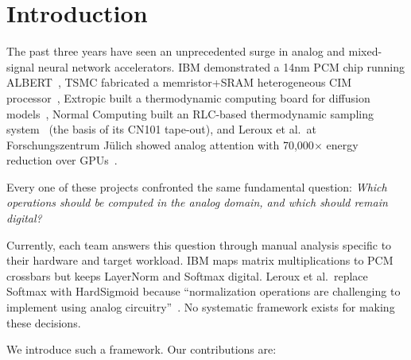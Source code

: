 \documentclass[11pt]{article}
\begin{document}
\begin{abstract}
non-idealities leave closure below $10^{-3}$ at a realistic 60~dB integrator gain; and thermal/shot noise is a third per-channel exposure obeying $\sigma_{\mathrm{pc}} = 0.78\sqrt{k_j\,2qB/I_0}$, equal to the mismatch residual at $I_0=1\,\mu$A and $B=122$~MHz, which is---to 2\%---the noise bandwidth the loop has when it is critically damped.
\end{abstract}

\section{Introduction}

The past three years have seen an unprecedented surge in analog and mixed-signal neural network accelerators. IBM demonstrated a 14nm PCM chip running ALBERT~\cite{ibm2025}, TSMC fabricated a memristor+SRAM heterogeneous CIM processor~\cite{tsmc2025}, Extropic built a thermodynamic computing board for diffusion models~\cite{extropic2025}, Normal Computing built an RLC-based thermodynamic sampling system~\cite{normal2025} (the basis of its CN101 tape-out), and Leroux et al.\ at Forschungszentrum J\"ulich showed analog attention with 70,000$\times$ energy reduction over GPUs~\cite{leroux2025a}.

Every one of these projects confronted the same fundamental question: \textit{Which operations should be computed in the analog domain, and which should remain digital?}

Currently, each team answers this question through manual analysis specific to their hardware and target workload. IBM maps matrix multiplications to PCM crossbars but keeps LayerNorm and Softmax digital. Leroux et al.\ replace Softmax with HardSigmoid because ``normalization operations are challenging to implement using analog circuitry''~\cite{leroux2025a}. No systematic framework exists for making these decisions.

We introduce such a framework. Our contributions are:
\end{document}
